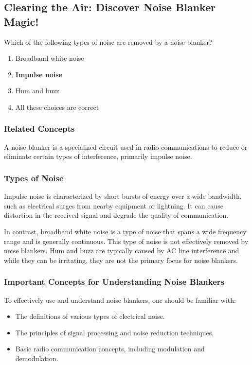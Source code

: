 \subsection{Clearing the Air: Discover Noise Blanker Magic!}

\begin{tcolorbox}[colback=gray!10, colframe=black, title=E4E03`]
Which of the following types of noise are removed by a noise blanker? 
\begin{enumerate}[label=\Alph*.]
    \item Broadband white noise
    \item \textbf{Impulse noise}
    \item Hum and buzz
    \item All these choices are correct
\end{enumerate} \end{tcolorbox}

\subsubsection{Related Concepts}

A noise blanker is a specialized circuit used in radio communications to reduce or eliminate certain types of interference, primarily impulse noise. 

\subsubsection{Types of Noise}
Impulse noise is characterized by short bursts of energy over a wide bandwidth, such as electrical surges from nearby equipment or lightning. It can cause distortion in the received signal and degrade the quality of communication.

In contrast, broadband white noise is a type of noise that spans a wide frequency range and is generally continuous. This type of noise is not effectively removed by noise blankers. Hum and buzz are typically caused by AC line interference and while they can be irritating, they are not the primary focus for noise blankers.

\subsubsection{Important Concepts for Understanding Noise Blankers}
To effectively use and understand noise blankers, one should be familiar with:
\begin{itemize}
    \item The definitions of various types of electrical noise.
    \item The principles of signal processing and noise reduction techniques.
    \item Basic radio communication concepts, including modulation and demodulation.
\end{itemize}

